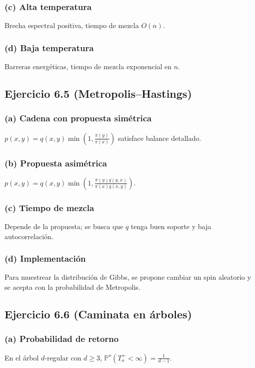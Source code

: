 \documentclass[letterpaper, 12pt]{article}
\renewcommand{\P}{\mathbb{P}}
\newcommand{\1}{\mathbbm{1}}
\begin{document}
    \subsubsection*{(c) Alta temperatura}
    Brecha espectral positiva, tiempo de mezcla $O(n)$.

    \subsubsection*{(d) Baja temperatura}
    Barreras energ\'eticas, tiempo de mezcla exponencial en $n$.

    \subsection{Ejercicio 6.5 (Metropolis–Hastings)}

    \subsubsection*{(a) Cadena con propuesta sim\'etrica}
    $p(x,y)=q(x,y)\min\left(1,\frac{\pi(y)}{\pi(x)}\right)$ satisface balance detallado.

    \subsubsection*{(b) Propuesta asim\'etrica}
    $p(x,y)=q(x,y)\min\left(1,\frac{\pi(y)q(y,x)}{\pi(x)q(x,y)}\right)$.

    \subsubsection*{(c) Tiempo de mezcla}
    Depende de la propuesta; se busca que $q$ tenga buen soporte y baja autocorrelaci\'on.

    \subsubsection*{(d) Implementaci\'on}
    Para muestrear la distribuci\'on de Gibbs, se propone cambiar un spin aleatorio y se acepta con la probabilidad de Metropolis.

    \subsection{Ejercicio 6.6 (Caminata en \'arboles)}

    \subsubsection*{(a) Probabilidad de retorno}
    En el \'arbol $d$-regular con $d\ge3$, $\P^o(T_o^+<\infty)=\frac{1}{d-1}$.
\end{document}
